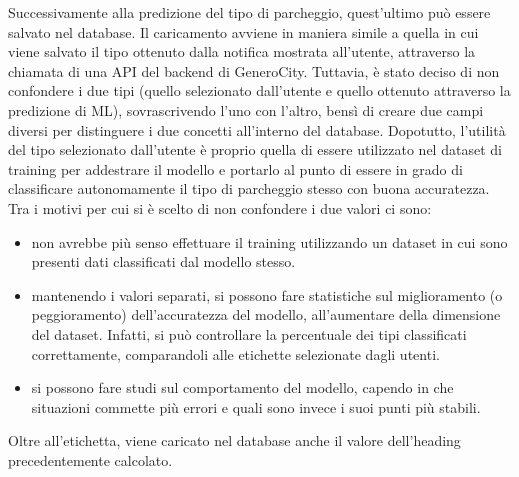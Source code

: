 Successivamente alla predizione del tipo di parcheggio, quest'ultimo può essere salvato
nel database. Il caricamento avviene in maniera simile a quella in cui viene salvato il 
tipo ottenuto dalla notifica mostrata all'utente, attraverso la chiamata di una API del 
backend di GeneroCity. Tuttavia, è stato deciso di non confondere i due tipi (quello
selezionato dall'utente e quello ottenuto attraverso la predizione di ML), sovrascrivendo
l'uno con l'altro, bensì di creare due campi diversi per distinguere i due concetti
all'interno del database. Dopotutto, l'utilità del tipo selezionato dall'utente è proprio
quella di essere utilizzato nel dataset di training per addestrare il modello e portarlo 
al punto di essere in grado di classificare autonomamente il tipo di parcheggio stesso
con buona accuratezza.
Tra i motivi per cui si è scelto di non confondere i due valori ci sono:
\begin{itemize}
    \item non avrebbe più senso effettuare il training utilizzando un dataset in cui sono
    presenti dati classificati dal modello stesso.
    \item mantenendo i valori separati, si possono fare statistiche sul miglioramento
    (o peggioramento) dell'accuratezza del modello, all'aumentare della dimensione del
    dataset. Infatti, si può controllare la percentuale dei tipi classificati correttamente,
    comparandoli alle etichette selezionate dagli utenti.
    \item si possono fare studi sul comportamento del modello, capendo in che situazioni
    commette più errori e quali sono invece i suoi punti più stabili.
\end{itemize}
Oltre all'etichetta, viene caricato nel database anche il valore dell'heading 
precedentemente calcolato.










